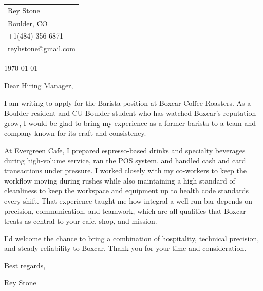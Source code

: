 \documentclass[11pt]{article}
\begin{document}
\hfill
\begin{tabular}{l @{}}
\hfill {Rey Stone} \\
\hfill {Boulder, CO} \\
\hfill {+1(484)-356-6871} \\
\hfill {reyhstone@gmail.com} \\
\end{tabular}

\today

\bigskip %

Dear Hiring Manager,

\bigskip %


I am writing to apply for the Barista position at Boxcar Coffee Roasters. As a Boulder resident and CU Boulder student who has watched Boxcar's reputation grow, I would be glad to bring my experience as a former barista to a team and company known for its craft and consistency.

At Evergreen Cafe, I prepared espresso-based drinks and specialty beverages during high-volume service, ran the POS system, and handled cash and card transactions under pressure. I worked closely with my co-workers to keep the workflow moving during rushes while also maintaining a high standard of cleanliness to keep the workspace and equipment up to health code standards every shift. That experience taught me how integral a well-run bar depends on precision, communication, and teamwork, which are all qualities that Boxcar treats as central to your cafe, shop, and mission.

I'd welcome the chance to bring a combination of hospitality, technical precision, and steady reliability to Boxcar. Thank you for your time and consideration.


\bigskip

Best regards,

Rey Stone
\end{document}
